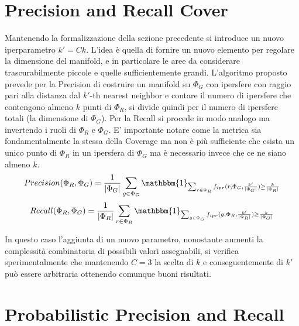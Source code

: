 \section{Precision and Recall Cover}
\label{sec:precision-and-recall-cover}

Mantenendo la formalizzazione della sezione precedente si introduce un nuovo iperparametro $k' = Ck$. L'idea è quella di fornire un nuovo elemento per regolare la dimensione del manifold, e in particolare
le aree da considerare trascurabilmente piccole e quelle sufficientemente grandi. L'algoritmo proposto prevede per la Precision di costruire un manifold su $\Phi_G$ con ipersfere con raggio pari alla distanza dal $k'$-th nearest neighbor
e contare il numero di ipersfere che contengono almeno $k$ punti di $\Phi_R$, si divide quindi per il numero di ipersfere totali (la dimensione di $\Phi_G$). Per la Recall si procede in modo analogo ma invertendo i ruoli di $\Phi_R$ e $\Phi_G$.
E' importante notare come la metrica sia fondamentalmente la stessa della Coverage ma non è più sufficiente che esista un unico punto di $\Phi_R$ in un ipersfera di $\Phi_G$ ma è necessario invece che ce ne siano almeno $k$.
\begin{equation}
    Precision(\Phi_R, \Phi_G) = \frac{1}{|\Phi_G|} \sum_{g \in \Phi_G} \mathbbm{1}_{\sum_{r \in \Phi_R} f_{ipr}(r,\Phi_G, \frac{k'}{|\Phi_G|}) \geq \frac{k}{|\Phi_R|}}
\end{equation}
\begin{equation}
    Recall(\Phi_R, \Phi_G) = \frac{1}{|\Phi_R|} \sum_{r \in \Phi_R} \mathbbm{1}_{\sum_{g \in \Phi_G} f_{ipr}(g,\Phi_R, \frac{k'}{|\Phi_R|}) \geq \frac{k}{|\Phi_G|}}
\end{equation}

In questo caso l'aggiunta di un nuovo parametro, nonostante aumenti la complessità combinatoria di possibili valori assegnabili, si verifica sperimentalmente che mantenendo $C=3$ la scelta di $k$ e conseguentemente di $k'$ può essere arbitraria
ottenendo comunque buoni risultati. 

\section{Probabilistic Precision and Recall}
\label{sec:probabilistic-precision-and-recall}

